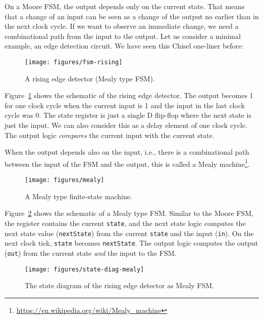 \documentclass[%
    10pt,
    headinclude, footexclude,
    openright, %
    notitlepage,
    cleardoubleempty,
    headsepline,
    pointlessnumbers,
    bibtotoc, idxtotoc,
    ]{scrbook}
\newcommand{\scale}{0.7}
\newcommand{\code}[1]{{\lstinline[basicstyle=\small\ttfamily]{#1}}}
\newcommand{\myref}[2]{\href{#1}{#2}}
\renewcommand{\myref}[2]{{#2}{\footnote{\url{#1}}}}
\begin{document}
On a Moore FSM, the output depends only on the current state.
That means that a change of an input can be seen as a change of the
output no earlier than in the next clock cycle.
If we want to observe an immediate change, we need a combinational
path from the input to the output.
Let us consider a minimal example, an edge detection circuit.
We have seen this Chisel one-liner before:


\begin{figure}
  \centering
  \texttt{[image: figures/fsm-rising]}
  \caption{A rising edge detector (Mealy type FSM).}
  \label{fig:fsm-rising}
\end{figure}

Figure~\ref{fig:fsm-rising} shows the schematic of the rising edge detector.
The output becomes 1 for one clock cycle when the current input is 1
and the input in the last clock cycle was 0.
The state register is just a single D flip-flop where the next state
is just the input. We can also consider this as a delay element of one
clock cycle. The output logic \emph{compares} the current
input with the current state.



When the output depends also on the input, i.e., there is a combinational path between
the input of the FSM and the output, this is called a
\myref{https://en.wikipedia.org/wiki/Mealy_machine}{Mealy machine}.

\begin{figure}
  \centering
  \texttt{[image: figures/mealy]}
  \caption{A Mealy type finite-state machine.}
  \label{fig:mealy}
\end{figure}

Figure~\ref{fig:mealy} shows the schematic of a Mealy type FSM.
Similar to the Moore FSM, the register contains the current \code{state}, and
the next state logic computes the next state value (\code{nextState})
from the current \code{state} and the input (\code{in}).
On the next clock tick, \code{state} becomes \code{nextState}.
The output logic computes the output (\code{out}) from the current state
\emph{and} the input to the FSM.


\begin{figure}
  \centering
  \texttt{[image: figures/state-diag-mealy]}
  \caption{The state diagram of the rising edge detector as Mealy FSM.}
  \label{fig:diag:mealy}
\end{figure}
\end{document}
